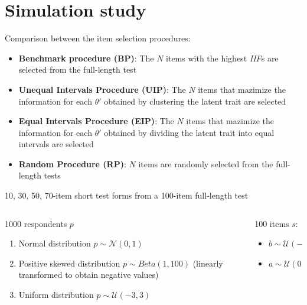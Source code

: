 \documentclass{beamer} %
\begin{document}
\section[Simulation]{Simulation study}

\begin{frame}
	Comparison between the item selection procedures: 
	\begin{itemize}
		\item \textbf{\textcolor{bp}{Benchmark procedure (BP)}}: The $N$ items with the highest \emph{IIF}s are selected from the full-length test
		\item \textbf{\textcolor{uip}{Unequal Intervals Procedure (UIP)}}:  The $N$ items that mazimize the information for each $\theta'$ obtained by clustering the latent trait are selected 
		\item \textbf{\textcolor{eip}{Equal Intervals Procedure (EIP)}}: The $N$ items that mazimize the information for each $\theta'$ obtained by dividing the latent trait into equal intervals are selected
		\item \textbf{\textcolor{rp}{Random Procedure (RP)}}: $N$ items are randomly selected from the full-length tests 
	\end{itemize}
\vspace{3mm}
10, 30, 50, 70-item short test forms from a  100-item full-length test 

\end{frame}

\begin{frame}
		\begin{columns}[T]
		\begin{column}{.50\linewidth}
			\begin{center}
				1000 respondents $p$
			\end{center}
			\begin{enumerate}
				\item Normal distribution $p \sim \mathcal{N}(0,1)$
				\item Positive skewed distribution $p \sim Beta(1, 100)$ (linearly transformed to obtain negative values)
				\item Uniform distribution $p \sim \mathcal{U}(-3,3)$
			\end{enumerate}
			
		\end{column}
		
		\begin{column}{.50\linewidth}
			\begin{center}
				100 items $s$:
			\end{center}
			\begin{itemize}
				\item $b \sim \mathcal{U}(-3,3)$
				\item  $a \sim \mathcal{U}(0.40,2)$
			\end{itemize}
		\end{column}
	\end{columns}
\end{frame}
\end{document}

